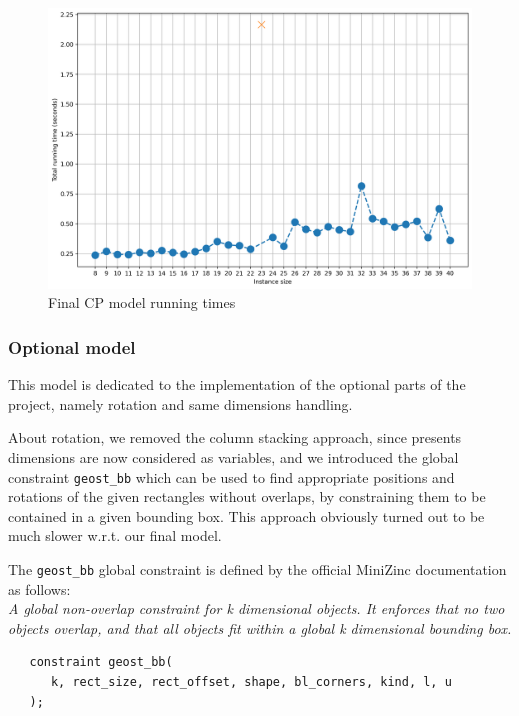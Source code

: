 \documentclass[a4paper,10pt]{article}
\begin{document}
\begin{figure}[h]
   \centering
   \includegraphics[scale=0.45]{cp-times.png}
   \caption{Final CP model running times}
\end{figure}

\subsubsection*{Optional model}
This model is dedicated to the implementation of the optional parts of the project, namely rotation and same dimensions handling.

About rotation, we removed the column stacking approach, since presents dimensions are now considered as variables, and we introduced the global constraint \texttt{geost\_bb} which can be used to find appropriate positions and rotations of the given rectangles without overlaps, by constraining them to be contained in a given bounding box. This approach obviously turned out to be much slower w.r.t. our final model.

The \texttt{geost\_bb} global constraint is defined by the official MiniZinc documentation \cite{minizinc} as follows: \\
\emph{A global non-overlap constraint for k dimensional objects. It enforces that no two objects overlap, and that all objects fit within a global k dimensional bounding box.}

\begin{verbatim}
   constraint geost_bb(
      k, rect_size, rect_offset, shape, bl_corners, kind, l, u
   );
\end{verbatim}
\end{document}
